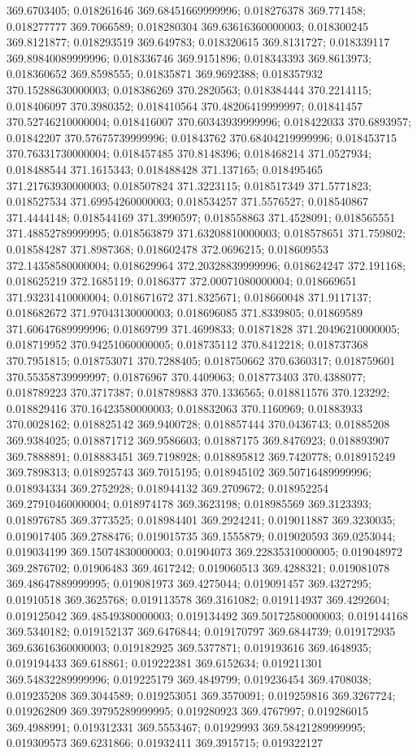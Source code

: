369.6703405; 0.018261646 369.68451669999996; 0.018276378 369.771458; 0.018277777 369.7066589; 0.018280304 369.63616360000003; 0.018300245 369.8121877; 0.018293519 369.649783; 0.018320615 369.8131727; 0.018339117 369.89840089999996; 0.018336746 369.9151896; 0.018343393 369.8613973; 0.018360652 369.8598555; 0.01835871 369.9692388; 0.018357932 370.15288630000003; 0.018386269 370.2820563; 0.018384444 370.2214115; 0.018406097 370.3980352; 0.018410564 370.48206419999997; 0.01841457 370.52746210000004; 0.018416007 370.60343939999996; 0.018422033 370.6893957; 0.01842207 370.57675739999996; 0.01843762 370.68404219999996; 0.018453715 370.76331730000004; 0.018457485 370.8148396; 0.018468214 371.0527934; 0.018488544 371.1615343; 0.018488428 371.137165; 0.018495465 371.21763930000003; 0.018507824 371.3223115; 0.018517349 371.5771823; 0.018527534 371.69954260000003; 0.018534257 371.5576527; 0.018540867 371.4444148; 0.018544169 371.3990597; 0.018558863 371.4528091; 0.018565551 371.48852789999995; 0.018563879 371.63208810000003; 0.018578651 371.759802; 0.018584287 371.8987368; 0.018602478 372.0696215; 0.018609553 372.14358580000004; 0.018629964 372.20328839999996; 0.018624247 372.191168; 0.018625219 372.1685119; 0.0186377 372.00071080000004; 0.018669651 371.93231410000004; 0.018671672 371.8325671; 0.018660048 371.9117137; 0.018682672 371.97043130000003; 0.018696085 371.8339805; 0.01869589 371.60647689999996; 0.01869799 371.4699833; 0.01871828 371.20496210000005; 0.018719952 370.94251060000005; 0.018735112 370.8412218; 0.018737368 370.7951815; 0.018753071 370.7288405; 0.018750662 370.6360317; 0.018759601 370.55358739999997; 0.01876967 370.4409063; 0.018773403 370.4388077; 0.018789223 370.3717387; 0.018789883 370.1336565; 0.018811576 370.123292; 0.018829416 370.16423580000003; 0.018832063 370.1160969; 0.01883933 370.0028162; 0.018825142 369.9400728; 0.018857444 370.0436743; 0.01885208 369.9384025; 0.018871712 369.9586603; 0.01887175 369.8476923; 0.018893907 369.7888891; 0.018883451 369.7198928; 0.018895812 369.7420778; 0.018915249 369.7898313; 0.018925743 369.7015195; 0.018945102 369.50716489999996; 0.018934334 369.2752928; 0.018944132 369.2709672; 0.018952254 369.27910460000004; 0.018974178 369.3623198; 0.018985569 369.3123393; 0.018976785 369.3773525; 0.018984401 369.2924241; 0.019011887 369.3230035; 0.019017405 369.2788476; 0.019015735 369.1555879; 0.019020593 369.0253044; 0.019034199 369.15074830000003; 0.01904073 369.22835310000005; 0.019048972 369.2876702; 0.01906483 369.4617242; 0.019060513 369.4288321; 0.019081078 369.48647889999995; 0.019081973 369.4275044; 0.019091457 369.4327295; 0.01910518 369.3625768; 0.019113578 369.3161082; 0.019114937 369.4292604; 0.019125042 369.48549380000003; 0.019134492 369.50172580000003; 0.019144168 369.5340182; 0.019152137 369.6476844; 0.019170797 369.6844739; 0.019172935 369.63616360000003; 0.019182925 369.5377871; 0.019193616 369.4648935; 0.019194433 369.618861; 0.019222381 369.6152634; 0.019211301 369.54832289999996; 0.019225179 369.4849799; 0.019236454 369.4708038; 0.019235208 369.3044589; 0.019253051 369.3570091; 0.019259816 369.3267724; 0.019262809 369.39795289999995; 0.019280923 369.4767997; 0.019286015 369.4988991; 0.019312331 369.5553467; 0.01929993 369.58421289999995; 0.019309573 369.6231866; 0.01932411 369.3915715; 0.019322127 